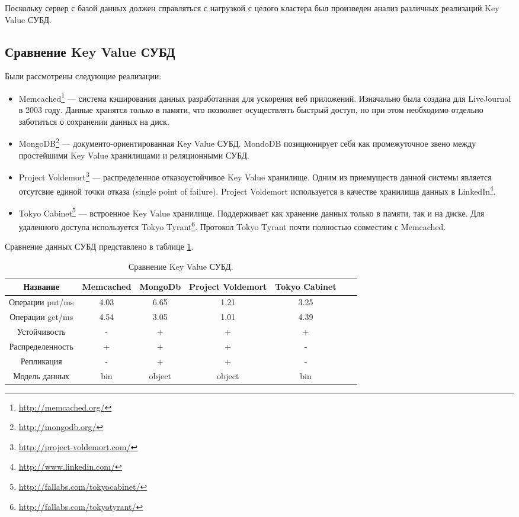 Поскольку сервер с базой данных должен справляться с нагрузкой с целого кластера был произведен анализ различных реализаций Key Value СУБД.
\subsection{Сравнение Key Value СУБД}
Были рассмотрены следующие реализации:
\begin{itemize}
 \item Memcached\footnote{\href{http://memcached.org/}{http://memcached.org/}} --- система кэширования данных разработанная для ускорения веб приложений. Изначально была создана для LiveJournal в 2003 году. Данные хранятся только в памяти, что позволяет осуществлять быстрый доступ, но при этом необходимо отдельно заботиться о сохранении данных на диск.
 \item MongoDB\footnote{\href{http://mongodb.org/}{http://mongodb.org/}} --- документо-ориентированная Key Value СУБД. MondoDB позиционирует себя как промежуточное звено между простейшими Key Value хранилищами и реляционными СУБД.
 \item Project Voldemort\footnote{\href{http://project-voldemort.com/}{http://project-voldemort.com/}} --- распределенное отказоустойчивое Key Value хранилище. Одним из приемуществ данной системы является отсутсвие единой точки отказа (single point of failure). Project Voldemort используется в качестве хранилища данных в LinkedIn\footnote{\href{http://www.linkedin.com/}{http://www.linkedin.com/}}.
 \item Tokyo Cabinet\footnote{\href{http://fallabs.com/tokyocabinet/}{http://fallabs.com/tokyocabinet/}} --- встроенное Key Value хранилище. Поддерживает как хранение данных только в памяти, так и на диске. Для удаленного доступа используется Tokyo Tyrant\footnote{\href{http://fallabs.com/tokyotyrant/}{http://fallabs.com/tokyotyrant/}}. Протокол Tokyo Tyrant почти полностью совместим с Memcached.
\end{itemize}

Сравнение данных СУБД представлено в таблице \ref{tab:kv}.

\begin{table}[h]
\caption{\label{tab:kv}Сравнение Key Value СУБД.}
\begin{center}
\begin{tabular}{|c|c|c|c|c|c|c|}
\hline
Название & Memcached & MongoDb & Project Voldemort & Tokyo Cabinet\\
\hline
Операции put/ms & 4.03 & 6.65 & 1.21 & 3.25 \\
\hline
Операции get/ms & 4.54 & 3.05 & 1.01 & 4.39 \\
\hline
Устойчивость & - & + & + & + \\
\hline
Распределенность & + & + & + & - \\
\hline
Репликация & - & + & + & - \\
\hline
Модель данных & bin & object & object & bin\\
\hline
\end{tabular}
\end{center}
\end{table}

